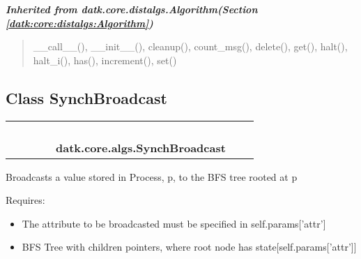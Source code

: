 \large{\textbf{\textit{Inherited from datk.core.distalgs.Algorithm\textit{(Section \ref{datk:core:distalgs:Algorithm})}}}}

\begin{quote}
\_\_call\_\_(), \_\_init\_\_(), cleanup(), count\_msg(), delete(), get(), halt(), halt\_i(), has(), increment(), set()
\end{quote}


\subsection{Class SynchBroadcast}

    \label{datk:core:algs:SynchBroadcast}
\begin{tabular}{cccccccc}
\multicolumn{2}{r}{\settowidth{\BCL}{datk.core.distalgs.Algorithm}\multirow{2}{\BCL}{datk.core.distalgs.Algorithm}}
&&
&&
  \\\cline{3-3}
  &&\multicolumn{1}{c|}{}
&&
&&
  \\
\multicolumn{4}{r}{\settowidth{\BCL}{datk.core.distalgs.Synchronous\_Algorithm}\multirow{2}{\BCL}{datk.core.distalgs.Synchronous\_Algorithm}}
&&
  \\\cline{5-5}
  &&&&\multicolumn{1}{c|}{}
&&
  \\
&&&&\multicolumn{2}{l}{\textbf{datk.core.algs.SynchBroadcast}}
\end{tabular}

Broadcasts a value stored in Process, p, to the BFS tree rooted at p

Requires:

\begin{itemize}
\setlength{\parskip}{0.6ex}
  \item The attribute to be broadcasted must be specified in 
    self.params['attr']

  \item BFS Tree with children pointers, where root node has 
    state[self.params['attr']]

\end{itemize}

